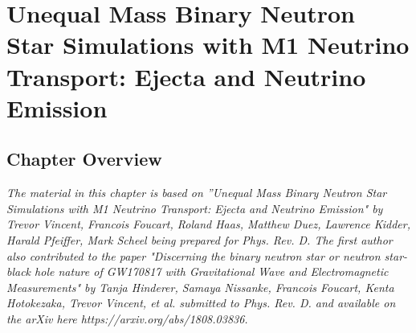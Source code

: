 \chapter{Unequal Mass Binary Neutron Star Simulations with M1 Neutrino Transport: Ejecta and Neutrino Emission}


\section{Chapter Overview}

\textit{The material in this chapter is based on ”Unequal Mass Binary Neutron Star Simulations with M1 Neutrino Transport: Ejecta and Neutrino Emission" by Trevor Vincent, Francois Foucart, Roland Haas, Matthew Duez, Lawrence Kidder, Harald Pfeiffer, Mark Scheel being prepared for Phys. Rev. D. The first author also contributed to the paper "Discerning the binary neutron star or neutron star-black hole nature of GW170817 with Gravitational Wave and Electromagnetic Measurements" by Tanja Hinderer, Samaya Nissanke, Francois Foucart, Kenta Hotokezaka, Trevor Vincent, et al. submitted to Phys. Rev. D. and available on the arXiv here https://arxiv.org/abs/1808.03836.}

